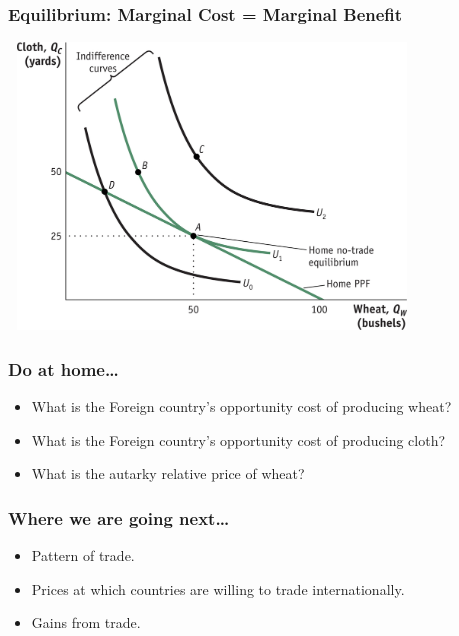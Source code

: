 \documentclass[handout]{beamer}
\begin{document}
\begin{frame}[t]
\frametitle{Equilibrium: Marginal Cost = Marginal Benefit}
\vspace{.2cm}
\includegraphics[height=3in,width=4.25in]{Feenstra_Essentials2e_fig_02_02.jpg}
\end{frame}


\begin{frame}[t]
\frametitle{Do at home\ldots}
\bigskip
\begin{itemize}
\item What is the Foreign country's opportunity cost of producing wheat?
\bigskip
\item What is the Foreign country's opportunity cost of producing cloth?
\bigskip
\item What is the autarky relative price of wheat?
\end{itemize}
\end{frame}



\begin{frame}[t]
\frametitle{Where we are going next\ldots}
\bigskip
\begin{itemize}
\item Pattern of trade.
\bigskip
\item Prices at which countries are willing to trade internationally.
\bigskip
\item Gains from trade.
\end{itemize}
\end{frame}
\end{document}

